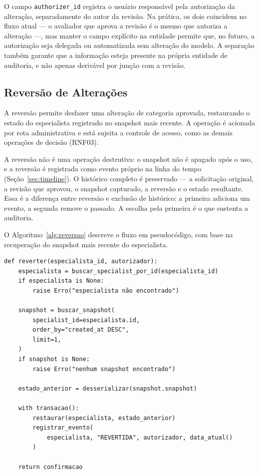 O campo \texttt{authorizer\_id} registra o usuário responsável pela 
autorização da alteração, separadamente do autor da revisão. Na prática, 
os dois coincidem no fluxo atual — o avaliador que aprova a revisão é o 
mesmo que autoriza a alteração —, mas manter o campo explícito na 
entidade permite que, no futuro, a autorização seja delegada ou 
automatizada sem alteração do modelo. A separação também garante que a 
informação esteja presente na própria entidade de auditoria, e não apenas 
derivável por junção com a revisão.

\subsection{Reversão de Alterações}
\label{sec:reversao}

A reversão permite desfazer uma alteração de categoria aprovada, 
restaurando o estado do especialista registrado no snapshot mais recente. 
A operação é acionada por rota administrativa e está sujeita a controle 
de acesso, como as demais operações de decisão (RNF03).

A reversão não é uma operação destrutiva: o snapshot não é apagado após 
o uso, e a reversão é registrada como evento próprio na linha do tempo 
(Seção~\ref{sec:timeline}). O histórico completo é preservado — a 
solicitação original, a revisão que aprovou, o snapshot capturado, a 
reversão e o estado resultante. Essa é a diferença entre reversão e 
exclusão de histórico: a primeira adiciona um evento, a segunda remove 
o passado. A escolha pela primeira é o que sustenta a auditoria.

\newpage

O Algoritmo~\ref{alg:reversao} descreve o fluxo em pseudocódigo, com 
base na recuperação do snapshot mais recente do especialista.

\begin{algorithm}[htbp]
\caption{Fluxo de reversão (pseudocódigo).}
\label{alg:reversao}
\begin{verbatim}
def reverter(especialista_id, autorizador):
    especialista = buscar_specialist_por_id(especialista_id)
    if especialista is None:
        raise Erro("especialista não encontrado")

    snapshot = buscar_snapshot(
        specialist_id=especialista.id,
        order_by="created_at DESC",
        limit=1,
    )
    if snapshot is None:
        raise Erro("nenhum snapshot encontrado")

    estado_anterior = desserializar(snapshot.snapshot)

    with transacao():
        restaurar(especialista, estado_anterior)
        registrar_evento(
            especialista, "REVERTIDA", autorizador, data_atual()
        )

    return confirmacao
\end{verbatim}
\end{algorithm}

